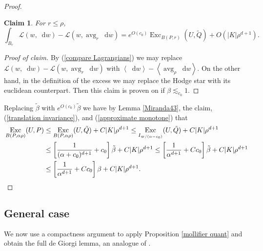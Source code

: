 \documentclass[reqno,10pt]{amsart}
\DeclareMathOperator{\avg}{avg}
\DeclareMathOperator{\Exc}{Exc}
\newcommand*\dif{\mathop{}\!\mathrm{d}}
\newcommand{\Lagrange}{\mathscr L}
\def\Japan#1{\left \langle #1 \right \rangle}
\newtheorem{claim}{Claim}[theorem]
\theoremstyle{definition}
\numberwithin{equation}{section}
\begin{document}
\begin{proof}
\begin{claim}
For $r \leq \rho$,
$$\int_{B_r} \Lagrange(w, \dif w) - \Lagrange(w, \avg_r \dif w) = e^{O(c_0)} \Exc_{B(P, r)} (U, \tilde Q) + O(|K| \rho^{d + 1}).$$
\end{claim}
\begin{proof}[Proof of claim]
By (\ref{compare Lagrangians}) we may replace $\Lagrange(w, \dif w) - \Lagrange(w, \avg_r \dif w)$ with $\Japan{\dif w} - \Japan{\avg_\rho \dif w}$.
On the other hand, in the definition of the excess we may replace the Hodge star with its euclidean counterpart.
Then this claim is proven on \cite[pg83]{Giusti77} if $\beta \lesssim_{c_0} 1$.
\end{proof}

Replacing $\tilde \beta$ with $e^{O(c_0)} \tilde \beta$ we have by Lemma \ref{Miranda43}, the claim, (\ref{translation invariance}), and (\ref{approximate monotone}) that 
\begin{align*}
\Exc_{B(P, \alpha \rho)} (U, P) &\leq \Exc_{B(P, \alpha \rho)} (U, \tilde Q) + C|K| \rho^{d + 1} \leq \Exc_{I_{\varpi/(\alpha - c_0)}} (U, \tilde Q) + C|K| \rho^{d + 1}\\
&\leq \left[\frac{1}{(\alpha + c_0)^{d + 1}} + c_0\right] \tilde \beta + C|K| \rho^{d + 1} \leq \left[\frac{1}{\alpha^{d + 1}} + Cc_0\right] \tilde \beta + C|K| \rho^{d + 1} \\
&\leq \left[\frac{1}{\alpha^{d + 1}} + Cc_0\right] \beta + C|K| \rho^{d + 1}. 
\qedhere 
\end{align*}
\end{proof}

\subsection{General case}
We now use a compactness argument to apply Proposition \ref{mollifier quant} and obtain the full de Giorgi lemma, an analogue of \cite[Teorema 5.7]{Miranda66}.
\end{document}
